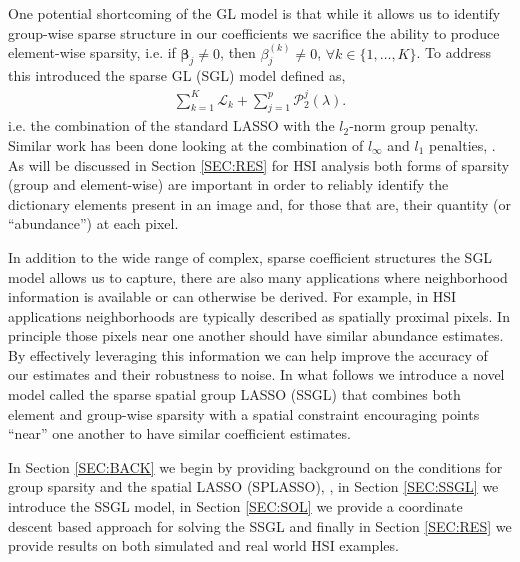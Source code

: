 \documentclass{article}
\numberwithin{equation}{section}
\theoremstyle{plain}
\newcommand{\bs}{\boldsymbol}
\begin{document}
One potential shortcoming of the GL model is that while it allows us to identify
group-wise sparse structure in our coefficients we sacrifice the ability to
produce element-wise sparsity, i.e.
if $\bs\beta_j \neq 0$, then $\beta_j^{(k)} \neq 0$, $\forall k \in
\{1,\ldots,K\}$. To address this \cite{simon2013} introduced the sparse GL (SGL)
model defined as,
\begin{align}
\label{EQ:SGL}
\sum_{k=1}^K \mathcal{L}_k
+ 
\sum_{j=1}^p\mathcal{P}_2^{j}(\lambda).
\end{align}
\noindent i.e. the combination
of the standard LASSO with the
$l_2$-norm group penalty. Similar work has been done looking at the combination
of $l_{\infty}$ and $l_1$ penalties, \cite{sgen2014}.
As will be discussed in Section \ref{SEC:RES} for HSI analysis both forms of
sparsity (group and element-wise) are important in order to reliably identify
the dictionary elements present in an image and, for those that are, their
quantity (or ``abundance'') at each pixel.

In addition to the wide range of complex, sparse coefficient structures the SGL
model allows us to capture, there are also many applications where neighborhood
information is available or can otherwise be derived.
For example, in HSI applications neighborhoods are typically described as
spatially proximal pixels. In principle those pixels near one another should
have similar abundance estimates. By effectively leveraging this information we
can help improve the accuracy of our estimates and their robustness to noise. In
what follows we introduce a novel model called the sparse spatial group LASSO
(SSGL) that combines both element and group-wise sparsity with a spatial
constraint encouraging points ``near'' one another to have similar coefficient
estimates.

In Section \ref{SEC:BACK} we begin by providing background on the conditions for
group sparsity and the spatial LASSO (SPLASSO), \cite{samarov2014splasso}, in
Section \ref{SEC:SSGL} we introduce the SSGL model, in Section \ref{SEC:SOL} we
provide a coordinate descent based approach for solving the SSGL and finally in
Section \ref{SEC:RES} we provide results on both simulated and real world HSI
examples.
\end{document}
